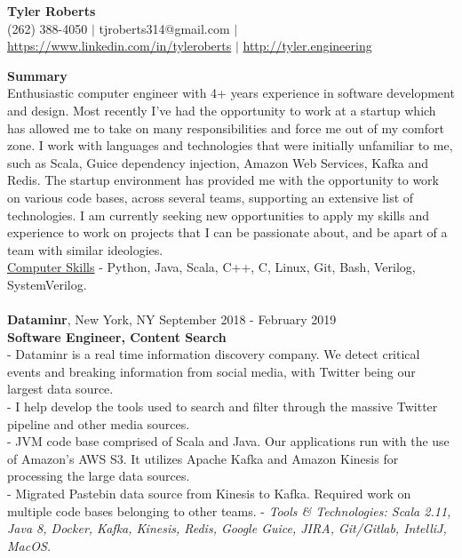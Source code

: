 \documentclass{resume}
\begin{document}
\begin{center}
{\LARGE \bf Tyler Roberts} \\[1mm]
\footnotesize
(262) 388-4050 $|$
tjroberts314@gmail.com $|$
\href{https://www.linkedin.com/in/tyleroberts}{https://www.linkedin.com/in/tyleroberts} $|$
\href{http://tyler.engineering}{http://tyler.engineering}
\end{center}
\begin{flushleft}

{\textbf{\large Summary}} \\
{
\footnotesize
\tab Enthusiastic computer engineer with 4+ years experience in software development and design. Most recently I've had the opportunity to work at a startup which has allowed me to take on many responsibilities and force me out of my comfort zone. I work with languages and technologies that were initially unfamiliar to me, such as Scala, Guice dependency injection, Amazon Web Services, Kafka and Redis. The startup environment has provided me with the opportunity to work on various code bases, across several teams, supporting an extensive list of technologies. I am currently seeking new opportunities to apply my skills and experience to work on projects that I can be passionate about, and be apart of a team with similar ideologies. \\[2mm]

}
\underline{Computer Skills} - Python, Java, Scala, C++, C, Linux, Git, Bash, Verilog, SystemVerilog. \\[5mm]
\\[2mm]

\textbf{Dataminr}, New York, NY \hfill September 2018 - February 2019\\
\textbf{Software Engineer, Content Search}\\
{\footnotesize
\ttab - Dataminr is a real time information discovery company. We detect critical events and breaking information from social \ttab media, with Twitter being our largest data source. \\
\ttab - I help develop the tools used to search and filter through the massive Twitter pipeline and other media sources. \\
\ttab - JVM code base comprised of Scala and Java. Our applications run with the use of Amazon's AWS S3. It utilizes Apache \ttab Kafka and Amazon Kinesis for processing the large data sources.\\
\ttab - Migrated Pastebin data source from Kinesis to Kafka. Required work on multiple code bases belonging to other teams.
\ttab- \textit{Tools \& Technologies: Scala 2.11, Java 8, Docker, Kafka, Kinesis, Redis, Google Guice, JIRA, Git/Gitlab, IntelliJ, MacOS.}\\[3mm]
}


\end{flushleft}
\end{document}

